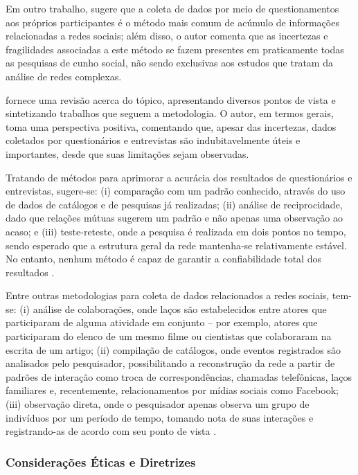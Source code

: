 Em outro trabalho,  sugere que a coleta de dados por meio de questionamentos aos próprios participantes é o método mais comum de acúmulo de informações relacionadas a redes sociais; além disso, o autor comenta que as incertezas e fragilidades associadas a este método se fazem presentes em praticamente todas as pesquisas de cunho social, não sendo exclusivas aos estudos que tratam da análise de redes complexas.

 fornece uma revisão acerca do tópico, apresentando diversos pontos de vista e sintetizando trabalhos que seguem a metodologia. O autor, em termos gerais, toma uma perspectiva positiva, comentando que, apesar das incertezas, dados coletados por questionários e entrevistas são indubitavelmente úteis e importantes, desde que suas limitações sejam observadas.

Tratando de métodos para aprimorar a acurácia dos resultados de questionários e entrevistas, sugere-se: (i) comparação com um padrão conhecido, através do uso de dados de catálogos e de pesquisas já realizadas; (ii) análise de reciprocidade, dado que relações mútuas sugerem um padrão e não apenas uma observação ao acaso; e (iii) teste-reteste, onde a pesquisa é realizada em dois pontos no tempo, sendo esperado que a estrutura geral da rede mantenha-se relativamente estável. No entanto, nenhum método é capaz de garantir a confiabilidade total dos resultados \cite{Marsden1990}.

Entre outras metodologias para coleta de dados relacionados a redes sociais, tem-se: (i) análise de colaborações, onde laços são estabelecidos entre atores que participaram de alguma atividade em conjunto -- por exemplo, atores que participaram do elenco de um mesmo filme ou cientistas que colaboraram na escrita de um artigo; (ii) compilação de catálogos, onde eventos registrados são analisados pelo pesquisador, possibilitando a reconstrução da rede a partir de padrões de interação como troca de correspondências, chamadas telefônicas, laços familiares e, recentemente, relacionamentos por mídias sociais como Facebook; (iii) observação direta, onde o pesquisador apenas observa um grupo de indivíduos por um período de tempo, tomando nota de suas interações e registrando-as de acordo com seu ponto de vista \cite{Marsden1990,Newman2004,Newman2010}.

\subsubsection{Considerações Éticas e Diretrizes} \label{sec:ethics}

